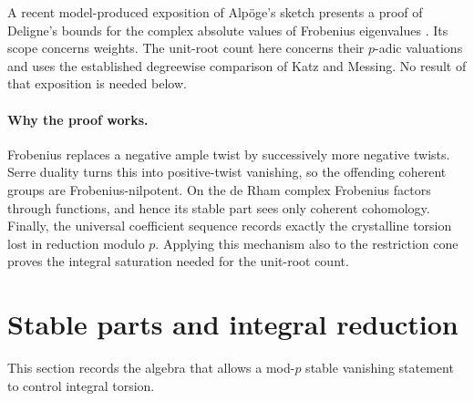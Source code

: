 \documentclass[11pt]{article}
\theoremstyle{remark}\newtheorem{remark}[theorem]{Remark}
\begin{document}
A recent model-produced exposition of Alp\"oge's sketch presents a proof of Deligne's bounds for the complex absolute values of Frobenius eigenvalues \citep{AlpogeExposition}. Its scope concerns weights. The unit-root count here concerns their $p$-adic valuations and uses the established degreewise comparison of Katz and Messing. No result of that exposition is needed below.

\paragraph{Why the proof works.}
Frobenius replaces a negative ample twist by successively more negative twists. Serre duality turns this into positive-twist vanishing, so the offending coherent groups are Frobenius-nilpotent. On the de Rham complex Frobenius factors through functions, and hence its stable part sees only coherent cohomology. Finally, the universal coefficient sequence records exactly the crystalline torsion lost in reduction modulo $p$. Applying this mechanism also to the restriction cone proves the integral saturation needed for the unit-root count.

\section{Stable parts and integral reduction}

This section records the algebra that allows a mod-$p$ stable vanishing statement to control integral torsion.
\end{document}
